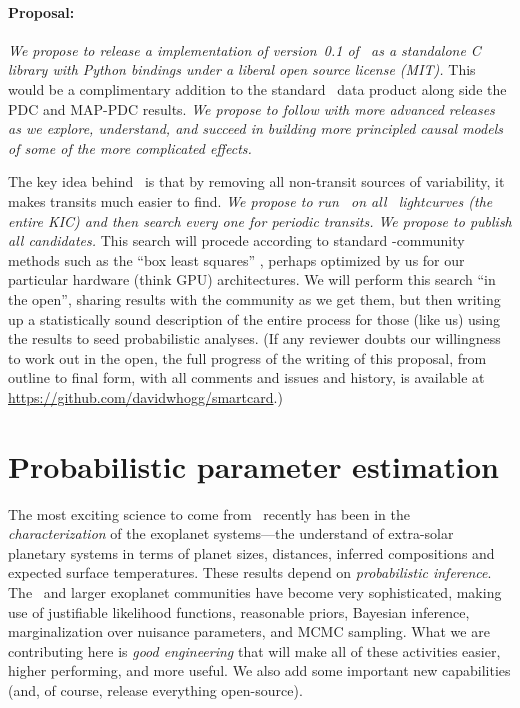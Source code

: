 \documentclass[letterpaper,12pt,preprint]{hack_aastex}
\newcommand{\hurl}[1]{{\scriptsize\url{#1}}}
\newcommand{\Untrendy}{\package{Untrendy}}
\begin{document}
\paragraph{Proposal:}
\emph{We propose to release a implementation of version~0.1 of \Untrendy\ as a standalone C
library with Python bindings under a liberal open source license (MIT).}
This would be a complimentary addition to the standard \Kepler\ data
product along side the PDC and MAP-PDC results.
\emph{We propose to follow with more advanced releases as we explore,
understand, and succeed in building more principled causal models of some
of the more complicated effects.}

The key idea behind \Untrendy\ is that by removing all non-transit
sources of variability, it makes transits much easier to find.
\emph{We propose to run \Untrendy\ on all \Kepler\ lightcurves (the
  entire KIC) and then search every one for periodic transits.  We
  propose to publish all candidates.}
This search will procede
according to standard \Kepler-community methods such as the ``box
least squares'' \citep{box}, perhaps optimized by us for our particular
hardware (think GPU) architectures.
We will perform this search ``in
the open'', sharing results with the community as we get them, but
then writing up a statistically sound description of the entire
process for those (like us) using the results to seed probabilistic
analyses.
(If any reviewer doubts our willingness to work out in the open, the
full progress of the writing of this proposal, from outline to final
form, with all comments and issues and history, is available at
\hurl{https://github.com/davidwhogg/smartcard}.)


\section{Probabilistic parameter estimation}

The most exciting science to come from \Kepler\ recently has been in
the \emph{characterization} of the exoplanet systems---the understand
of extra-solar planetary systems in terms of planet sizes, distances,
inferred compositions and expected surface temperatures.  These
results depend on \emph{probabilistic inference}.  The \Kepler\ and
larger exoplanet communities have become very sophisticated, making
use of justifiable likelihood functions, reasonable priors, Bayesian
inference, marginalization over nuisance parameters, and MCMC
sampling.  What we are contributing here is \emph{good engineering}
that will make all of these activities easier, higher performing, and
more useful.  We also add some important new capabilities (and, of course, release everything open-source).
\end{document}

